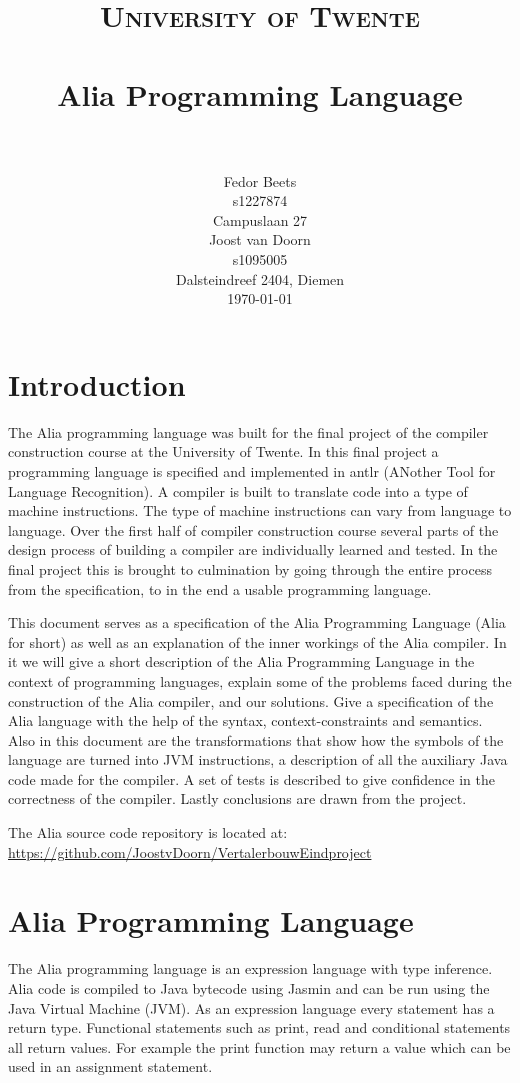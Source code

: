 \documentclass[paper=a4, fontsize=11pt]{article}
\title{
		\usefont{OT1}{bch}{b}{n}
		\normalfont \normalsize \textsc{University of Twente} \\ [25pt]
		\horrule{0.5pt} \\[0.4cm]
		\huge Alia Programming Language \\
		\horrule{2pt} \\[0.5cm]
}
\author{
		\normalfont 								\normalsize
        Fedor Beets\\[-3pt]						\small
        s1227874\\[-3pt]        				\small
        Campuslaan 27\\[8pt]					\normalsize
        Joost van Doorn\\[-3pt]					\small
        s1095005\\[-3pt]						\small
        Dalsteindreef 2404, Diemen\\[8pt]			\normalsize
        \today
}
\date{}
\numberwithin{equation}{section}		%
\numberwithin{figure}{section}			%
\numberwithin{table}{section}				%
\begin{document}
\maketitle
\newpage
\section*{Introduction}
The Alia programming language was built for the final project of the compiler construction course at the University of Twente. In this final project a programming language is specified and implemented in antlr (ANother Tool for Language Recognition). A compiler is built to translate code into a type of machine instructions. The type of machine instructions can vary from language to language. Over the first half of compiler construction course several parts of the design process of building a compiler are individually learned and tested. In the final project this is brought to culmination by going through the entire process from the specification, to in the end a usable programming language. 

This document serves as a specification of the Alia Programming Language (Alia for short) as well as an explanation of the inner workings of the Alia compiler. In it we will give a short description of the Alia Programming Language in the context of programming languages, explain some of the problems faced during the construction of the Alia compiler,  and our solutions. Give a specification of the Alia language with the help of the syntax, context-constraints and semantics. Also in this document are the transformations that show how the symbols of the language are turned into JVM instructions, a description of all the auxiliary Java code made for the compiler. A set of tests is described to give confidence in the correctness of the compiler. Lastly conclusions are drawn from the project.

The Alia source code repository is located at:
\url{https://github.com/JoostvDoorn/VertalerbouwEindproject}

\section{Alia Programming Language}
The Alia programming language is an expression language with type inference. Alia code is compiled to Java bytecode using Jasmin and can be run using the Java Virtual Machine (JVM). As an expression language every statement has a return type. Functional statements such as print, read and conditional statements all return values. For example the print function may return a value which can be used in an assignment statement.
\end{document}
